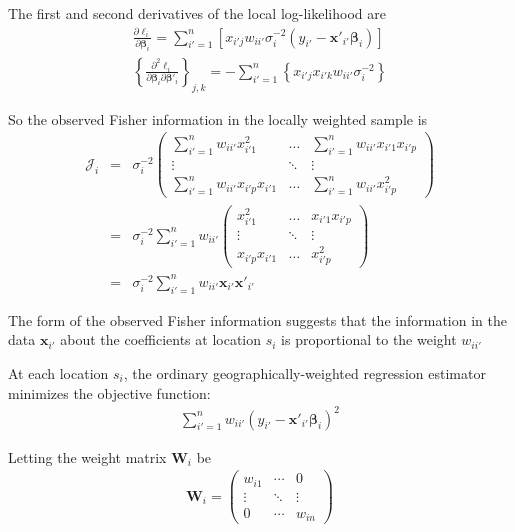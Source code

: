 \documentclass[authoryear, review, 11pt]{elsarticle}
\begin{document}
	The first and second derivatives of the local log-likelihood are
	\begin{eqnarray}
		\frac{\partial \ell_i}{\partial \bm{\beta}_i} =   \sum_{i'=1}^n \left[ x_{i'j} w_{ii'} \sigma^{-2}_i \left( y_{i'} - \bm{x}'_{i'} \bm{\beta}_i \right) \right] \\
		\left\{\frac{\partial^2 \ell_i}{\partial \bm{\beta}_i \partial \bm{\beta}'_i} \right\}_{j,k} = -\sum_{i'=1}^n \left\{ x_{i'j} x_{i'k} w_{ii'} \sigma^{-2}_i \right\}
	\end{eqnarray}
	
	So the observed Fisher information in the locally weighted sample is
	\begin{eqnarray}
		\bm{\mathcal{J}}_i &=& \sigma^{-2}_i \left( \begin{array}{ccc} \sum_{i'=1}^n  w_{ii'} x^2_{i'1}   & \dots & \sum_{i'=1}^n w_{ii'} x_{i'1} x_{i'p}   \\ \vdots & \ddots & \vdots \\ \sum_{i'=1}^n  w_{ii'} x_{i'p} x_{i'1}    & \dots & \sum_{i'=1}^n  w_{ii'} x^2_{i'p}  \end{array} \right) \\
		&=& \sigma^{-2}_i \sum_{i'=1}^n w_{ii'}\left( \begin{array}{ccc}  x^2_{i'1} & \dots & x_{i'1} x_{i'p} \\ \vdots & \ddots & \vdots \\ x_{i'p} x_{i'1} & \dots &  x^2_{i'p} \end{array} \right) \\
		&=& \sigma^{-2}_i \sum_{i'=1}^n w_{ii'} \bm{x}_{i'} \bm{x}'_{i'}
	\end{eqnarray}	
	
	The form of the observed Fisher information suggests that the information in the data $\bm{x}_{i'}$ about the coefficients at location $s_i$ is proportional to the weight $w_{ii'}$
	
	At each location $s_i$, the ordinary geographically-weighted regression estimator minimizes the objective function:
	\begin{eqnarray}
		\sum_{i'=1}^n w_{ii'} \left(y_{i'} - \bm{x}'_{i'} \bm{\beta}_i \right)^2
	\end{eqnarray}
	
	Letting the weight matrix $\bm{W}_i$ be	
	\begin{eqnarray}
		\bm{W}_i =  \left( \begin{array}{ccc} w_{i1} & \cdots & 0 \\ \vdots & \ddots & \vdots \\ 0 & \cdots & w_{in} \end{array} \right)
	\end{eqnarray}
	
\end{document}

